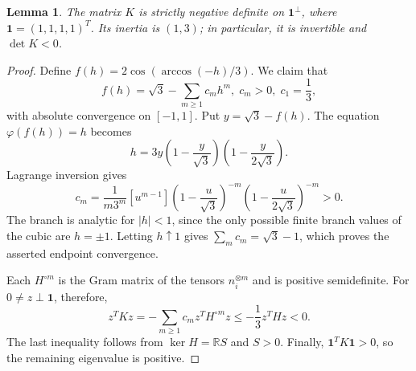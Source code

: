 \documentclass[10pt,a4paper]{amsart}
\newtheorem{lemma}[theorem]{Lemma}
\newcommand{\R}{\mathbb{R}}
\newcommand{\one}{\mathbf 1}
\newcommand{\ph}{\varphi}
\begin{document}
\begin{lemma}
\label{lem:negative}
The matrix $K$ is strictly negative definite on $\one^\perp$, where $\one=(1,1,1,1)^T$. Its inertia is $(1,3)$; in particular, it is invertible and $\det K<0$.
\end{lemma}

\begin{proof}
Define $f(h)=2\cos(\arccos(-h)/3)$. We claim that
\[
f(h)=\sqrt3-\sum_{m\ge1}c_mh^m,\;
c_m>0,\; c_1=\frac13,
\]
with absolute convergence on $[-1,1]$. Put $y=\sqrt3-f(h)$. The equation $\ph(f(h))=h$ becomes
\[
h=3y\left(1-\frac{y}{\sqrt3}\right)
       \left(1-\frac{y}{2\sqrt3}\right).
\]
Lagrange inversion gives
\[
c_m=\frac{1}{m3^m}[u^{m-1}]
\left(1-\frac{u}{\sqrt3}\right)^{-m}
\left(1-\frac{u}{2\sqrt3}\right)^{-m}>0.
\]
The branch is analytic for $|h|<1$, since the only possible finite branch values of the cubic are $h=\pm1$. Letting $h\uparrow1$ gives $\sum_m c_m=\sqrt3-1$, which proves the asserted endpoint convergence.

Each $H^{\circ m}$ is the Gram matrix of the tensors $n_i^{\otimes m}$ and is positive semidefinite. For $0\ne z\perp\one$, therefore,
\[
z^TKz=-\sum_{m\ge1}c_mz^TH^{\circ m}z
\le-\frac13z^THz<0.
\]
The last inequality follows from $\ker H=\R S$ and $S>0$. Finally, $\one^TK\one>0$, so the remaining eigenvalue is positive.
\end{proof}
\end{document}
